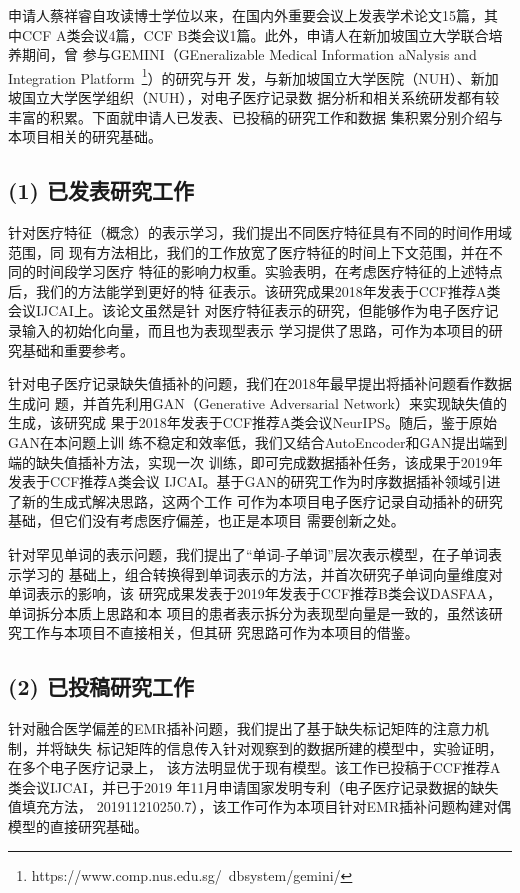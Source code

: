\documentclass[a4paper,zihao=-4]{article}
\begin{document}
申请人蔡祥睿自攻读博士学位以来，{\kaishu 在国内外重要会议上发表学术论文15篇，其
中CCF A类会议4篇，CCF B类会议1篇}。此外，申请人在新加坡国立大学联合培养期间，曾
参与GEMINI（GEneralizable Medical Information aNalysis and Integration
Platform~\footnote{https://www.comp.nus.edu.sg/~dbsystem/gemini/}）的研究与开
发，与新加坡国立大学医院（NUH）、新加坡国立大学医学组织（NUH），对电子医疗记录数
据分析和相关系统研发都有较丰富的积累。下面就申请人已发表、已投稿的研究工作和数据
集积累分别介绍与本项目相关的研究基础。

\subsection*{(1) 已发表研究工作}

针对医疗特征（概念）的表示学习，我们提出不同医疗特征具有不同的时间作用域范围，同
现有方法相比，我们的工作放宽了医疗特征的时间上下文范围，并在不同的时间段学习医疗
特征的影响力权重。实验表明，在考虑医疗特征的上述特点后，我们的方法能学到更好的特
征表示。该研究成果2018年发表于{\kaishu CCF推荐A类会议IJCAI}上。该论文虽然是针
对医疗特征表示的研究，但能够作为电子医疗记录输入的初始化向量，而且也为表现型表示
学习提供了思路，可作为本项目的研究基础和重要参考。

针对电子医疗记录缺失值插补的问题，我们在2018年最早提出将插补问题看作数据生成问
题，并首先利用GAN（Generative Adversarial Network）来实现缺失值的生成，该研究成
果于2018年发表于{\kaishu CCF推荐A类会议NeurIPS}。随后，鉴于原始GAN在本问题上训
练不稳定和效率低，我们又结合AutoEncoder和GAN提出端到端的缺失值插补方法，实现一次
训练，即可完成数据插补任务，该成果于2019年发表于{\kaishu CCF推荐A类会议
IJCAI}。基于GAN的研究工作为时序数据插补领域引进了新的生成式解决思路，这两个工作
可作为本项目电子医疗记录自动插补的研究基础，但它们没有考虑医疗偏差，也正是本项目
需要创新之处。

针对罕见单词的表示问题，我们提出了“单词-子单词”层次表示模型，在子单词表示学习的
基础上，组合转换得到单词表示的方法，并首次研究子单词向量维度对单词表示的影响，该
研究成果发表于2019年发表于{\kaishu CCF推荐B类会议DASFAA}，单词拆分本质上思路和本
项目的患者表示拆分为表现型向量是一致的，虽然该研究工作与本项目不直接相关，但其研
究思路可作为本项目的借鉴。

\subsection*{(2) 已投稿研究工作}

针对融合医学偏差的EMR插补问题，我们提出了基于缺失标记矩阵的注意力机制，并将缺失
标记矩阵的信息传入针对观察到的数据所建的模型中，实验证明，在多个电子医疗记录上，
该方法明显优于现有模型。该工作已投稿于{\kaishu CCF推荐A类会议IJCAI}，并已于2019
年11月{\kaishu 申请国家发明专利}（电子医疗记录数据的缺失值填充方法，
201911210250.7），该工作可作为本项目针对EMR插补问题构建对偶模型的直接研究基础。
\end{document}
